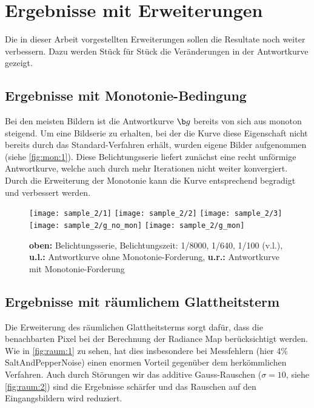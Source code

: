 \section{Ergebnisse mit Erweiterungen}
Die in dieser Arbeit vorgestellten Erweiterungen sollen die Resultate noch weiter verbessern. Dazu werden Stück für Stück die Veränderungen in der Antwortkurve gezeigt.

\subsection{Ergebnisse mit \gls{Monotonie}-Bedingung}

Bei den meisten Bildern ist die Antwortkurve $\b g$ bereits von sich aus monoton steigend. Um eine Bildserie zu erhalten, bei der die Kurve diese Eigenschaft nicht bereits durch das Standard-Verfahren erhält, wurden eigene Bilder aufgenommen (siehe \autoref{fig:mon:1}). Diese Belichtungsserie liefert zunächst eine recht unförmige Antwortkurve, welche auch durch mehr Iterationen nicht weiter konvergiert. Durch die Erweiterung der Monotonie kann die Kurve entsprechend begradigt und verbessert werden.

\begin{figure}
  \begin{center}
    \texttt{[image: sample\_2/1]}
    \texttt{[image: sample\_2/2]}
    \texttt{[image: sample\_2/3]}\\ \vspace{5pt}
    \texttt{[image: sample\_2/g\_no\_mon]} \hspace{1pt}
    \texttt{[image: sample\_2/g\_mon]}
    \caption{\textbf{oben:} Belichtungsserie, Belichtungszeit: 1/8000, 1/640, 1/100 (v.l.), \textbf{u.l.:} Antwortkurve ohne Monotonie-Forderung, \textbf{u.r.:} Antwortkurve mit Monotonie-Forderung}
    \label{fig:mon:1}
  \end{center}
\end{figure}



\subsection{Ergebnisse mit räumlichem Glattheitsterm}

Die Erweiterung des räumlichen Glattheitsterms sorgt dafür, dass die benachbarten Pixel bei der Berechnung der \gls{Radiance Map} berücksichtigt werden. Wie in \autoref{fig:raum:1} zu sehen, hat dies insbesondere bei Messfehlern (hier 4\% \gls{SaltAndPepperNoise}) einen enormen Vorteil gegenüber dem herkömmlichen Verfahren. Auch durch Störungen wir das additive Gauss-Rauschen ($\sigma=10$, siehe \autoref{fig:raum:2}) sind die Ergebnisse schärfer und das Rauschen auf den Eingangsbildern wird reduziert.



